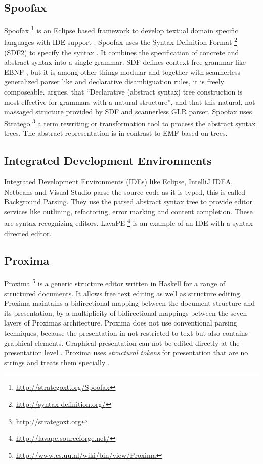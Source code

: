 \subsection{Spoofax}
Spoofax \footnote{\raggedright \url{http://strategoxt.org/Spoofax}} is an Eclipse based framework to develop textual domain specific languages with IDE support \cite{Spoofax}. Spoofax uses the Syntax Definition Format \footnote{\raggedright \url{http://syntax-definition.org/}} (SDF2) to specify the syntax \cite{Spoofax}. It combines the specification of concrete and abstract syntax into a single grammar. SDF defines context free grammar like EBNF \cite{sdf}, but it is among other things modular and together with scannerless generalized parser like \cite{sglr} and declarative disambiguation rules, it is freely composeable.  \cite{bible} argues, that ``Declarative (abstract syntax) tree construction is most effective for grammars with a natural structure'', and that this natural, not massaged structure provided by SDF and scannerless GLR parser. Spoofax uses Stratego \footnote{\raggedright \url{http://strategoxt.org}} a term rewriting or transformation tool \cite{stratego} to process the abstract syntax trees. The abstract representation is in contrast to EMF based on trees.


\subsection{Integrated Development Environments}
Integrated Development Environments (IDEs) like Eclipse, IntelliJ IDEA, Netbeans and Visual Studio parse the source code as it is typed, this is called Background Parsing. They use the parsed abstract syntax tree to provide editor services like outlining, refactoring, error marking and content completion. These are syntax-recognizing editors. LavaPE \footnote{\raggedright \url{http://lavape.sourceforge.net/}} is an example of an IDE with a syntax directed editor.  


\subsection{Proxima} 
Proxima \footnote{\raggedright \url{http://www.cs.uu.nl/wiki/bin/view/Proxima}}  is a generic structure editor written in Haskell for a range of structured documents. It allows free text editing as well as structure editing. Proxima maintains a bidirectional mapping between the document structure and its presentation, by a multiplicity of bidirectional mappings between the seven layers of Proximas architecture. Proxima does not use conventional parsing techniques, because the presentation in not restricted to text but also contains graphical elements. Graphical presentation can not be edited directly at the presentation level \cite{beyond_ascii}. Proxima uses \emph{structural tokens} for presentation that are no strings and treats them specially \cite{proxima}.

